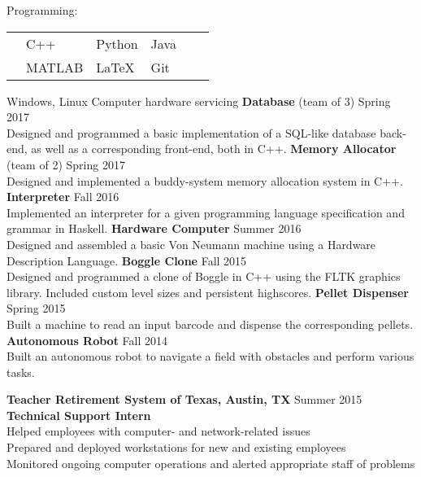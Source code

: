 \documentclass[12pt]{article}
\begin{document}
\begin{flushleft}
\begin{outline}[compactitem]
    \1 Programming: 
    \\
    \vspace{-\baselineskip}\vspace{-\upspacelength}
    \begin{tabularx}{\textwidth}{X X X X X X}
      & C++   & Python & Java\upspace \\
      & MATLAB& LaTeX & Git\upspace \\
    \end{tabularx}
    \vspace{-5px}\upspace
    \1 
    Windows, Linux
      \1
    Computer hardware servicing
    \hfill\hfill
      \1 \textbf{Database} (team of 3) \hfill Spring 2017
      \\ Designed and programmed a basic implementation of a SQL-like database back-end, as well as a corresponding front-end, both in C++.
      \1 \textbf{Memory Allocator} (team of 2) \hfill Spring 2017
      \\ Designed and implemented a buddy-system memory allocation system in C++.
      \1 \textbf{Interpreter} \hfill Fall 2016
      \\ Implemented an interpreter for a given programming language specification and grammar in Haskell.
      \1 \textbf{Hardware Computer} \hfill Summer 2016
      \\ Designed and assembled a basic Von Neumann machine using a Hardware Description Language.
      \1 \textbf{Boggle Clone} \hfill Fall 2015
      \\ Designed and programmed a clone of Boggle in C++ using the FLTK graphics library. Included custom level sizes and persistent highscores.
      \1 \textbf{Pellet Dispenser} \hfill Spring 2015
      \\ Built a machine to read an input barcode and dispense the corresponding pellets.
      \1 \textbf{Autonomous Robot} \hfill Fall 2014
      \\ Built an autonomous robot to navigate a field with obstacles and perform various tasks.

    \1 \textbf{Teacher Retirement System of Texas, Austin, TX} \hfill Summer 2015
    \\ \textbf{Technical Support Intern}
    \\ Helped employees with computer- and network-related issues
    \\ Prepared and deployed workstations for new and existing employees
    \\ Monitored ongoing computer operations and alerted appropriate staff of problems


\end{outline}
\end{flushleft}
\end{document}
